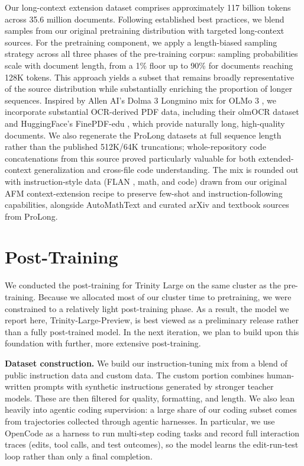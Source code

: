\documentclass{article}
\begin{document}
Our long-context extension dataset comprises approximately 117 billion tokens across 35.6 million documents. Following established best practices, we blend samples from our original pretraining distribution with targeted long-context sources. For the pretraining component, we apply a length-biased sampling strategy across all three phases of the pre-training corpus: sampling probabilities scale with document length, from a 1\% floor up to 90\% for documents reaching 128K tokens. This approach yields a subset that remains broadly representative of the source distribution while substantially enriching the proportion of longer sequences. Inspired by Allen AI's Dolma 3 Longmino mix for OLMo 3 \citep{olmo2025olmo3}, we incorporate substantial OCR-derived PDF data, including their olmOCR \citep{poznanski2025olmocrunlockingtrillionstokens} dataset and HuggingFace's FinePDF-edu \citep{kydlíček2025_finepdfs_liberating_3t_of_the_finest_tokens_from_pdfs}, which provide naturally long, high-quality documents. We also regenerate the ProLong datasets \citep{gao2025trainlongcontextlanguagemodels} at full sequence length rather than the published 512K/64K truncations; whole-repository code concatenations from this source proved particularly valuable for both extended-context generalization and cross-file code understanding. The mix is rounded out with instruction-style data (FLAN \citep{chung2022scalinginstructionfinetunedlanguagemodels}, math, and code) drawn from our original AFM context-extension recipe to preserve few-shot and instruction-following capabilities, alongside AutoMathText \citep{zhang2025autonomousdataselectionzeroshot} and curated arXiv and textbook sources from ProLong.

\section{Post-Training}

We conducted the post-training for Trinity Large on the same cluster as the pre-training. Because we allocated most of our cluster time to pretraining, we were constrained to a relatively light post-training phase. As a result, the model we report here, Trinity-Large-Preview, is best viewed as a preliminary release rather than a fully post-trained model. In the next iteration, we plan to build upon this foundation with further, more extensive post-training. 

\textbf{Dataset construction.} We build our instruction-tuning mix from a blend of public instruction data and custom data. The custom portion combines human-written prompts with synthetic instructions generated by stronger teacher models. These are then filtered for quality, formatting, and length. We also lean heavily into agentic coding supervision: a large share of our coding subset comes from trajectories collected through agentic harnesses. In particular, we use OpenCode \citep{opencodeai2026} as a harness to run multi-step coding tasks and record full interaction traces (edits, tool calls, and test outcomes), so the model learns the edit-run-test loop rather than only a final completion.
\end{document}
